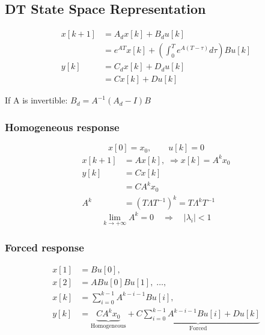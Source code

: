 \subsection{DT State Space Representation}
    \vspace*{-0.5em}
    \begin{align*}
        x[k+1] &= A_d x[k] + B_d u[k]\\
        &= e^{A T} x[k] + \left(\int_{0}^{T} e^{A (T-\tau)}d\tau\right)B u[k]\\
        y[k] &= C_d x[k] + D_d u[k]\\
        &= C x[k] + D u[k]
    \end{align*}

    \quad If A is invertible: $B_d = A^{-1}(A_d - I)B$

    \subsubsection{Homogeneous response}
    \vspace*{-0.5em}
    $$
    x[0] = x_0, \qquad u[k] = 0
    $$
    \begin{align*}
        x[k+1] &= Ax[k], \; \Rightarrow  x[k] = A^kx_0\\
        y[k] &= Cx[k]\\
        &= CA^kx_0\\[3pt]
        A^k &= (T\Lambda T^{-1})^k = T\Lambda^kT^{-1}
    \end{align*}
    \vspace*{-1em}
    $$
    \lim_{k\rightarrow +\infty}A^k = 0 \quad \Longrightarrow \quad \left\lvert \lambda_i \right\rvert < 1
    $$

    \subsubsection{Forced response}
    \vspace*{-1em}
    \begin{align*}
        x[1] &= Bu[0],\\
        x[2] &= ABu[0] Bu[1], \; \hdots ,\\[2pt]
        x[k] &= \sum_{i=0}^{k-1} A^{k-i-1}Bu[i],\\
        y[k] &= \underbrace{CA^kx_0}_{\text{Homogeneous}} + \underbrace{C\sum_{i=0}^{k-1} A^{k-i-1}Bu[i] + Du[k]}_{\text{Forced}}
    \end{align*}
    \vspace*{0em}